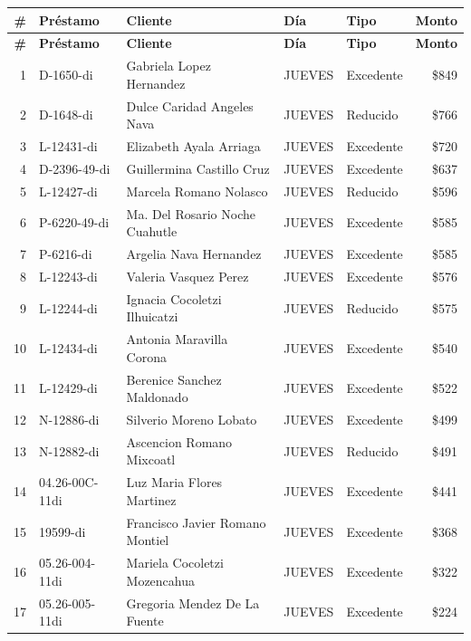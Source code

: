 \documentclass[11pt,a4paper]{article}
\newcommand{\money}[1]{\$\num{#1}}
\begin{document}
\begin{center}
\renewcommand{\arraystretch}{1.1}
\footnotesize
\begin{longtable}{rlp{5.5cm}llr}
\toprule
\textbf{\#} & \textbf{Pr\'estamo} & \textbf{Cliente} & \textbf{D\'ia} & \textbf{Tipo} & \textbf{Monto} \\
\midrule
\endfirsthead
\toprule
\textbf{\#} & \textbf{Pr\'estamo} & \textbf{Cliente} & \textbf{D\'ia} & \textbf{Tipo} & \textbf{Monto} \\
\midrule
\endhead
1 & D-1650-di & Gabriela Lopez Hernandez & JUEVES & Excedente & \money{849} \\
2 & D-1648-di & Dulce Caridad Angeles Nava & JUEVES & Reducido & \money{766} \\
3 & L-12431-di & Elizabeth Ayala Arriaga & JUEVES & Excedente & \money{720} \\
4 & D-2396-49-di & Guillermina Castillo Cruz & JUEVES & Excedente & \money{637} \\
5 & L-12427-di & Marcela Romano Nolasco & JUEVES & Reducido & \money{596} \\
6 & P-6220-49-di & Ma. Del Rosario Noche Cuahutle & JUEVES & Excedente & \money{585} \\
7 & P-6216-di & Argelia Nava Hernandez & JUEVES & Excedente & \money{585} \\
8 & L-12243-di & Valeria Vasquez Perez & JUEVES & Excedente & \money{576} \\
9 & L-12244-di & Ignacia Cocoletzi Ilhuicatzi & JUEVES & Reducido & \money{575} \\
10 & L-12434-di & Antonia Maravilla Corona & JUEVES & Excedente & \money{540} \\
11 & L-12429-di & Berenice Sanchez Maldonado & JUEVES & Excedente & \money{522} \\
12 & N-12886-di & Silverio Moreno Lobato & JUEVES & Excedente & \money{499} \\
13 & N-12882-di & Ascencion Romano Mixcoatl & JUEVES & Reducido & \money{491} \\
14 & 04.26-00C-11di & Luz Maria Flores Martinez & JUEVES & Excedente & \money{441} \\
15 & 19599-di & Francisco Javier Romano Montiel & JUEVES & Excedente & \money{368} \\
16 & 05.26-004-11di & Mariela Cocoletzi Mozencahua & JUEVES & Excedente & \money{322} \\
17 & 05.26-005-11di & Gregoria Mendez De La Fuente & JUEVES & Excedente & \money{224} \\

\bottomrule
\end{longtable}
\end{center}
\end{document}
